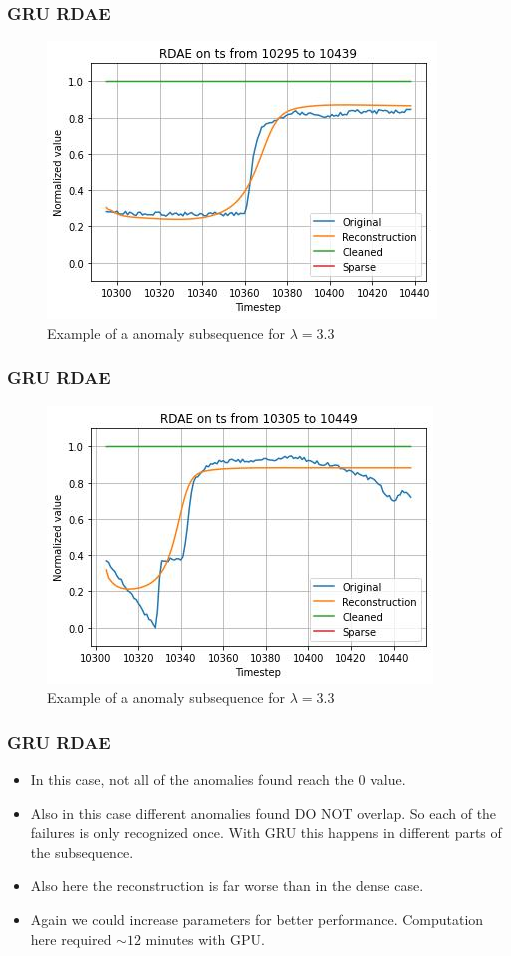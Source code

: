 \documentclass{beamer}
\theoremstyle{plain}
\theoremstyle{definition}
\theoremstyle{remark}
\begin{document}
\begin{frame}
	\frametitle{GRU RDAE}
	\begin{figure}
		\centering
		\includegraphics[width=0.7\linewidth]{Images/GRUlam3.3ts_anomalyzoom10295.jpg}
		\caption[]{Example of a anomaly subsequence for $\lambda=3.3$}
	\end{figure}
\end{frame}

\begin{frame}
	\frametitle{GRU RDAE}
	\begin{figure}
		\centering
		\includegraphics[width=0.7\linewidth]{Images/GRUlam3.3ts_anomalyzoom10305.jpg}
		\caption[]{Example of a anomaly subsequence for $\lambda=3.3$}
	\end{figure}
\end{frame}

\begin{frame}
	\frametitle{GRU RDAE}
	\begin{itemize}
		\item In this case, not all of the anomalies found reach the $0$ value.
		\item Also in this case different anomalies found DO NOT overlap. So each of the failures is only recognized once. With GRU this happens in different parts of the subsequence.
		\item Also here the reconstruction is far worse than in the dense case.
		\item Again we could increase parameters for better performance. Computation here required $\sim 12$ minutes with GPU.
	\end{itemize}
\end{frame}
\end{document}
